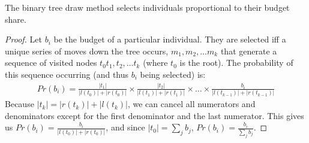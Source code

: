 \begin{proposition}
The binary tree draw method selects individuals proportional to their
budget share.
\end{proposition} 
\begin{proof}  
Let $b_i$ be the budget of a particular individual. They are selected
iff a unique series of moves down the tree occurs, $m_1,m_2,\ldots
m_k$ that generate a sequence of visited nodes $t_0t_1,t_2,\ldots t_k$
(where $t_0$ is the root). The probability of this sequence occurring
(and thus $b_i$ being selected) is:
\begin{eqnarray*} 
  Pr(b_i) = \frac{|t_1|}{|l(t_0)| + |r(t_0)|} \times
  \frac{|t_2|}{|l(t_1)| + |r(t_1)|} \times \ldots \times
  \frac{b_i}{|l(t_{k-1})| + |r(t_{k-1})|}
\end{eqnarray*} 
Because $|t_k| = |r(t_k)| + |l(t_k)|$, we can cancel all numerators
and denominators except for the first denominator and the last
numerator. This gives us $Pr(b_i) = \frac{b_i}{|l(t_0)| + |r(t_0)|}$,
and since $|t_0| = \sum_j b_j$, $Pr(b_i) = \frac{b_i}{\sum_j b_j}$.
\end{proof} 


